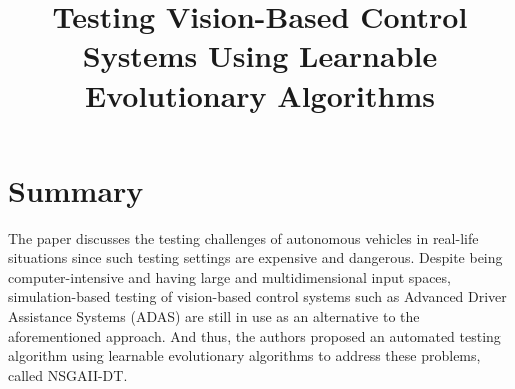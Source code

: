 \documentclass[10pt,a4paper]{report}
\title{Testing Vision-Based Control Systems Using Learnable Evolutionary Algorithms}
\begin{document}
\begin{center}
\textbf{\thetitle}
\end{center}


\section{Summary}
The paper discusses the testing challenges of autonomous vehicles in real-life situations since such testing settings are expensive and dangerous. 
%
Despite being computer-intensive and having large and multidimensional input spaces, simulation-based testing of vision-based control systems such as Advanced Driver Assistance Systems (ADAS) are still in use as an alternative to the aforementioned approach.
%
And thus, the authors proposed an automated testing algorithm using learnable evolutionary algorithms to address these problems, called NSGAII-DT.
%
\end{document}
